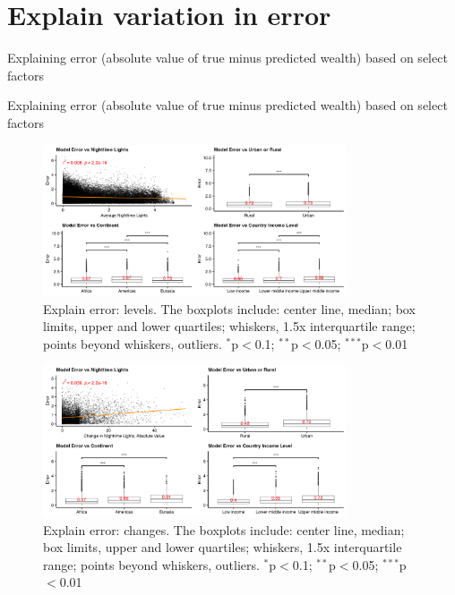 \documentclass{article}
\begin{document}

\newpage
\section{Explain variation in error}
\label{si:expl_error_var}

\singlespacing
\begin{table}[H]
\small
\caption{Explaining error (absolute value of true minus predicted wealth) based on select factors}
\label{tab:explain_error_levels_lm}
\centering

\end{table}
\normalsize
\doublespacing

\singlespacing
\begin{table}[H]
\small
\caption{Explaining error (absolute value of true minus predicted wealth) based on select factors}
\label{tab:explain_error_changes_lm}
\centering

\end{table}
\normalsize
\doublespacing

\begin{figure}[H]
    \centering
    \includegraphics[width=0.8\textwidth]{figures/explain_error_levels.png}
    \caption{Explain error: levels. The boxplots include: center line, median; box limits, upper and lower quartiles; whiskers, 1.5x interquartile range; points beyond whiskers, outliers. {$^{*}$p$<$0.1; $^{**}$p$<$0.05; $^{***}$p$<$0.01}}
     \label{fig:explain_error_levels}
\end{figure}

\begin{figure}[H]
    \centering
    \includegraphics[width=0.8\textwidth]{figures/explain_error_changes.png}
    \caption{Explain error: changes. The boxplots include: center line, median; box limits, upper and lower quartiles; whiskers, 1.5x interquartile range; points beyond whiskers, outliers. {$^{*}$p$<$0.1; $^{**}$p$<$0.05; $^{***}$p$<$0.01}}
     \label{fig:explain_error_changes}
\end{figure}
\end{document}

